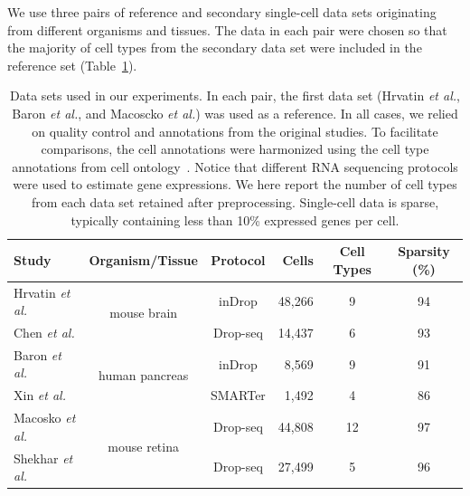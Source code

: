 \documentclass[runningheads]{llncs}
\newcommand{\etal}{\textit{et al.}}
\begin{document}
We use three pairs of reference and secondary single-cell data sets originating from different organisms and tissues. The data in each pair were chosen so that the majority of cell types from the secondary data set were included in the reference set (Table~\ref{tab:datasets}).

\begin{table}[ht]
\begin{center}
\setlength\tabcolsep{4pt}
\begin{tabular}{l c c r c c}
\toprule
Study & Organism/Tissue & Protocol & Cells & Cell Types & Sparsity (\%) \\
\midrule
Hrvatin \etal & \multirow{2}{*}{mouse brain} & inDrop & 48,266 & 9 & 94 \\
Chen \etal & & Drop-seq & 14,437 & 6 & 93 \\[5pt]
Baron \etal & \multirow{2}{*}{human pancreas} & inDrop & 8,569 & 9 & 91 \\
Xin \etal & & SMARTer & 1,492 & 4 & 86 \\[5pt]
Macosko \etal & \multirow{2}{*}{mouse retina} & Drop-seq & 44,808 & 12 & 97 \\
Shekhar \etal & & Drop-seq & 27,499 & 5 & 96 \\
\bottomrule
\end{tabular}
\end{center}
\caption{Data sets used in our experiments. In each pair, the first data set (Hrvatin \etal, Baron \etal, and Macoscko \etal) was used as a reference. In all cases, we relied on quality control and annotations from the original studies. To facilitate comparisons, the cell annotations were harmonized using the cell type annotations from cell ontology~\cite{cell_ontology}. Notice that different RNA sequencing protocols were used to estimate gene expressions. We here report the number of cell types from each data set retained after preprocessing. Single-cell data is sparse, typically containing less than 10\% expressed genes per cell.}
\label{tab:datasets}
\end{table}
\end{document}
